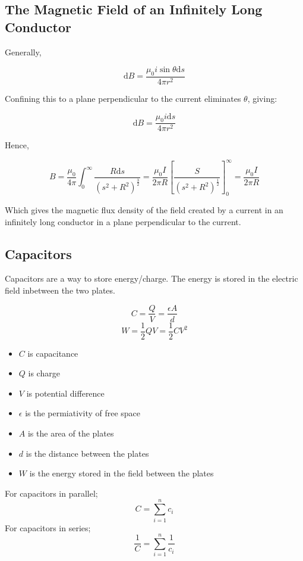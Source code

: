 \documentclass{article}
\begin{document}
\subsection{The Magnetic Field of an Infinitely Long Conductor}

Generally,

\[\textrm{d}B = \frac{\mu_0 i \sin\theta \textrm{d}s}{4\pi r^2}\]

\noindent Confining this to a plane perpendicular to the current eliminates $\theta$, giving:

\[\textrm{d}B = \frac{\mu_0 i \textrm{d}s}{4\pi r^2}\]

\noindent Hence,

\[B=\frac{\mu_0}{4\pi}\int_0^\infty\frac{R \textrm{d}s}{\left(s^2 + R^2\right)^{\frac{3}{2}}}=\frac{\mu_0 I}{2\pi R}\left[\frac{S}{\left(s^2 + R^2\right)^{\frac{1}{2}}}\right]_0^\infty=\frac{\mu_0 I}{2\pi R}\]

\noindent Which gives the magnetic flux density of the field created by a current in an infinitely long conductor in a plane perpendicular to the current.

\subsection{Capacitors}


Capacitors are a way to store energy/charge. The energy is stored in the electric field inbetween the two plates.

\[C=\frac{Q}{V}=\frac{\epsilon A}{d}\]
\[W=\frac{1}{2}QV=\frac{1}{2}CV^2\]

\begin{itemize}
	\item $C$ is capacitance
	\item $Q$ is charge
	\item $V$ is potential difference
	\item $\epsilon$ is the permiativity of free space
	\item $A$ is the area of the plates
	\item $d$ is the distance between the plates
	\item $W$ is the energy stored in the field between the plates
\end{itemize}

\noindent For capacitors in parallel;
\[C=\sum_{i=1}^nc_i\]
\noindent For capacitors in series;
\[\frac{1}{C}=\sum_{i=1}^n\frac{1}{c_i}\]
\end{document}
